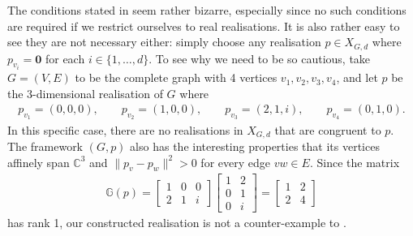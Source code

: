 The conditions stated in  seem rather bizarre,
especially since no such conditions are required if we restrict ourselves to real realisations.
It is also rather easy to see they are not necessary either:
simply choose any realisation $p \in X_{G,d}$ where $p_{v_i} = \mathbf{0}$ for each $i \in \{1,\ldots,d\}$.
To see why we need to be so cautious,
take $G=(V,E)$ to be the complete graph with 4 vertices $v_1,v_2,v_3,v_4$,
and let $p$ be the 3-dimensional realisation of $G$ where
\begin{align*}
	p_{v_1} = (0,0,0), \qquad p_{v_2} = (1,0,0), \qquad p_{v_3} = (2,1,i), \qquad p_{v_4} = (0,1,0).
\end{align*}
In this specific case, there are no realisations in $X_{G,d}$ that are congruent to $p$.
The framework $(G,p)$ also has the interesting properties that its vertices affinely span $\mathbb{C}^3$ and $\|p_v-p_w\|^2 >0$ for every edge $vw \in E$.
Since the matrix
\begin{align*}
	\mathbb{G}(p) =
	\begin{bmatrix}
		1 & 0 & 0 \\
		2 & 1 & i
	\end{bmatrix}
	\begin{bmatrix}
		1 & 2 \\
		0 & 1 \\
		0 & i
	\end{bmatrix}
	=
	\begin{bmatrix}
		1 & 2 \\
		2 & 4
	\end{bmatrix}
\end{align*}
has rank 1,
our constructed realisation is not a counter-example to .

